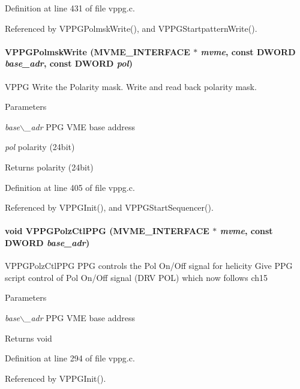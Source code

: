 Definition at line 431 of file vppg.c.

Referenced by VPPGPolmskWrite(), and VPPGStartpatternWrite().
\paragraph[{VPPGPolmskWrite}]{ VPPGPolmskWrite ({\bf MVME\_\-INTERFACE} $\ast$ {\em mvme}, \/  const {\bf DWORD} {\em base\_\-adr}, \/  const {\bf DWORD} {\em pol})}\hfill\label{vppg_8h_a10ec4e8a15c99cffbb75a1bba6d72c1d}
VPPG Write the Polarity mask.  Write and read back polarity mask. 
\begin{DoxyParams}{Parameters}
\item[{\em base$\backslash$\_\-adr}]PPG VME base address \item[{\em pol}]polarity (24bit) \end{DoxyParams}
\begin{DoxyReturn}{Returns}
polarity (24bit) 
\end{DoxyReturn}


Definition at line 405 of file vppg.c.

Referenced by VPPGInit(), and VPPGStartSequencer().
\paragraph[{VPPGPolzCtlPPG}]{\setlength{\rightskip}{0pt plus 5cm}void VPPGPolzCtlPPG ({\bf MVME\_\-INTERFACE} $\ast$ {\em mvme}, \/  const {\bf DWORD} {\em base\_\-adr})}\hfill\label{vppg_8h_a28d2b68c7c0e8d305cc8dd37edfd7dec}
VPPGPolzCtlPPG PPG controls the Pol On/Off signal for helicity  Give PPG script control of Pol On/Off signal (DRV POL) which now follows ch15 
\begin{DoxyParams}{Parameters}
\item[{\em base$\backslash$\_\-adr}]PPG VME base address \end{DoxyParams}
\begin{DoxyReturn}{Returns}
void 
\end{DoxyReturn}


Definition at line 294 of file vppg.c.

Referenced by VPPGInit().
